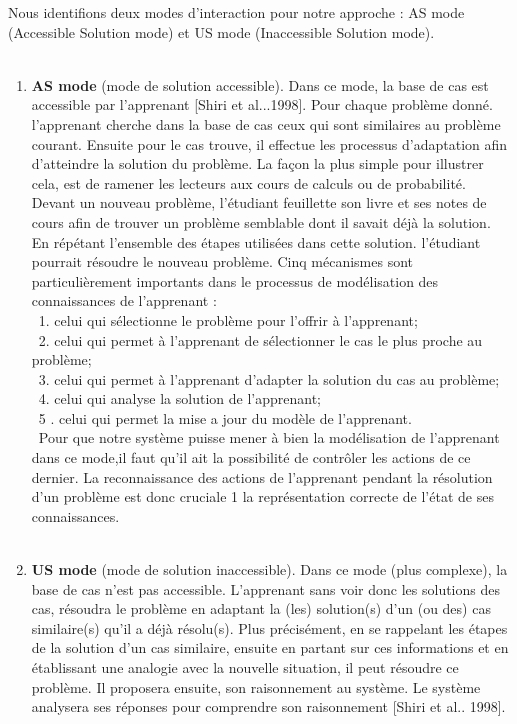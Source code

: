 Nous identifions deux modes d'interaction pour notre approche :
AS mode (Accessible Solution mode) et US mode (Inaccessible Solution mode). \\\
\begin{enumerate}
\item \textbf{AS mode} (mode de solution accessible). Dans ce mode, la base de cas est accessible par l'apprenant [Shiri et al...1998]. Pour chaque problème donné. l'apprenant cherche dans la base de cas ceux qui sont similaires au problème courant. Ensuite pour le cas trouve, il effectue les processus d'adaptation afin d'atteindre la solution du problème.
La façon la plus simple pour illustrer cela, est de ramener les lecteurs aux cours de calculs ou de probabilité. Devant un nouveau problème, l'étudiant feuillette son livre et ses notes de cours afin de trouver un problème semblable dont il savait déjà la  solution. En répétant l'ensemble des étapes utilisées dans cette solution. l'étudiant pourrait résoudre le nouveau problème.
Cinq mécanismes sont particulièrement importants dans le processus de modélisation
des connaissances de l'apprenant :\\\
    1. celui qui sélectionne le problème pour l'offrir à l'apprenant;\\\
    2. celui qui permet à l'apprenant de sélectionner le cas le plus proche au problème;\\\
    3. celui qui permet à l'apprenant d'adapter la solution du cas au problème;\\\
    4. celui qui analyse la solution de l'apprenant;\\\
    5 . celui qui permet la mise a jour du modèle de l'apprenant.\\\
Pour que notre système puisse mener à bien la modélisation de l'apprenant dans ce mode,il faut qu'il ait la possibilité de contrôler les actions de ce dernier. La reconnaissance des actions de l'apprenant pendant la résolution d'un problème est donc cruciale 1 la représentation correcte de l'état de ses connaissances. \\\
\item \textbf{US mode} (mode de solution inaccessible). Dans ce mode (plus complexe), la base de cas n'est pas accessible. L'apprenant sans voir donc les solutions des cas, résoudra le problème en adaptant la (les) solution(s) d'un (ou des) cas similaire(s) qu'il a déjà résolu(s). Plus précisément, en se rappelant les étapes de la solution d'un cas similaire, ensuite en partant sur ces informations et en établissant une analogie avec la nouvelle situation, il peut résoudre ce problème. Il proposera ensuite, son raisonnement au système. Le système analysera ses réponses pour comprendre son raisonnement [Shiri et al.. 1998].
\end{enumerate}
\\\

